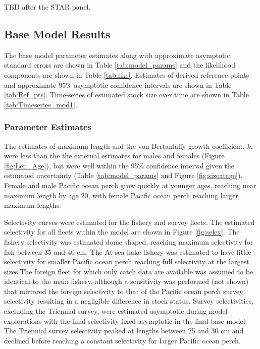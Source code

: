 \documentclass[12pt,]{article}
\begin{document}
TBD after the STAR panel.

\subsection{Base Model Results}\label{base-model-results}

The base model parameter estimates along with approximate asymptotic
standard errors are shown in Table \ref{tab:model_params} and the
likelihood components are shown in Table \ref{tab:like}. Estimates of
derived reference points and approximate 95\% asymptotic confidence
intervals are shown in Table \ref{tab:Ref_pts}. Time-series of estimated
stock size over time are shown in Table \ref{tab:Timeseries_mod1}.

\subsubsection{Parameter Estimates}\label{parameter-estimates}

The estimates of maximum length and the von Bertanlaffy growth
coefficient, \(k\), were less than the the external estimates for males
and females (Figure \ref{fig:Len_Age}), but were well within the 95\%
confidence interval given the estimated uncertainty (Table
\ref{tab:model_params} and Figure \ref{fig:sizeatage}). Female and male
Pacific ocean perch grow quickly at younger ages, reaching near maximum
length by age 20, with female Pacific ocean perch reaching larger
maximum lengths.

Selectivity curves were estimated for the fishery and survey fleets. The
estimated selectivity for all fleets within the model are shown in
Figure \ref{fig:selex}. The fishery selectivity was estimated dome
shaped, reaching maximum selectivity for fish between 35 and 40 cm. The
At-sea hake fishery was estimated to have little selectivity for smaller
Pacific ocean perch reaching full selectivity at the largest sizes.The
foreign fleet for which only catch data are available was assumed to be
identical to the main fishery, although a sensitivity was performed (not
shown) that mirrored the foreign selectivity to that of the Pacific
ocean perch survey selectivity resulting in a negligible difference in
stock status. Survey selectivities, excluding the Triennial survey, were
estimated asymptotic during model explorations with the final
selectivity fixed asymptotic in the final base model. The Triennial
survey selectivity peaked at lengths between 25 and 30 cm and declined
before reaching a constant selectivity for larger Pacific ocean perch.
\end{document}
